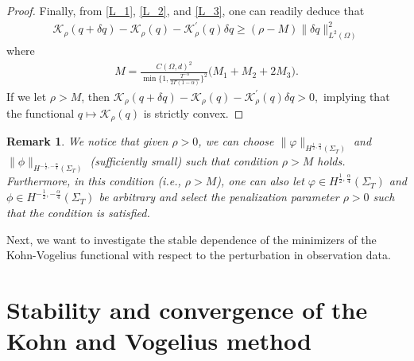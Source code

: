 \documentclass[a4paper,12pt,reqno,natbib]{amsart}
\newtheorem{remark}[theorem]{Remark}
\begin{document}
\begin{proof}
Finally, from \eqref{L_1}, \eqref{L_2}, and  \eqref{L_3}, one can readily deduce that 
\begin{align*}
    \mathcal{K}_\rho(q+\delta q)-\mathcal{K}_\rho(q) -\mathcal{K}^\prime_\rho(q)\delta q \geq(\rho -M) \|\delta q\|_{L^2(\Omega)}^2
\end{align*}
where
\begin{align} \label{constant_M}
    M=\frac{C(\Omega,d)^2}{\min\{1,\frac{T^{-\alpha}}{2\Gamma(1-\alpha)}\}^2}\Big(M_1+M_2+2M_3\Big).
\end{align}
If we let $\rho>M$, then $\mathcal{K}_\rho(q+\delta q)-\mathcal{K}_\rho(q) -\mathcal{K}^\prime_\rho(q)\delta q>0,$ implying that the functional $q\longmapsto\mathcal{K}_\rho(q)$ is strictly convex.
\end{proof}

\begin{remark}\label{con-sta}We notice that given $\rho>0$, we can choose $\|\varphi\|_{H^{\frac{1}{2}, \frac{\alpha}{4} }(\Sigma_T)}$ and $\|\phi\|_{H^{-\frac{1}{2}, -\frac{\alpha}{4} }(\Sigma_T)}$ (sufficiently small)  such that
condition $\rho>M$ holds. Furthermore, in this condition (i.e., $\rho>M$), one can also let $\varphi\in H^{\frac{1}{2}, \frac{\alpha}{4} }(\Sigma_T)$ and $\phi\in H^{-\frac{1}{2}, -\frac{\alpha}{4} }(\Sigma_T)$ be arbitrary and select the penalization parameter $\rho > 0$ such that the condition is satisfied.
\end{remark}





















Next, we want to investigate the stable dependence of the minimizers of the Kohn-Vogelius functional with respect to the perturbation in observation data.




\section{Stability and convergence of the Kohn and Vogelius method}\label{sec:stability}
\end{document}

